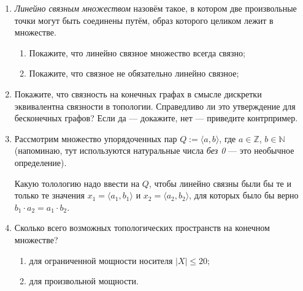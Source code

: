 \documentclass[10pt,a4paper,oneside]{article}
\begin{document}
\begin{enumerate}
\item \emph{Линейно связным множеством} назовём такое, в котором две произвольные точки могут быть соединены путём,
образ которого целиком лежит в множестве. 
\begin{enumerate}
\item Покажите, что линейно связное множество всегда связно;
\item Покажите, что связное не обязательно линейно связное;
\end{enumerate}

\item Покажите, что связность на конечных графах в смысле дискретки эквивалентна связности в топологии. 
Справедливо ли это утверждение для бесконечных графов? Если да --- докажите, нет --- приведите контрпример.

\item Рассмотрим множество упорядоченных пар $Q := \langle a,b \rangle$, где $a \in \mathbb{Z}$, $b \in \mathbb{N}$
(напоминаю, тут используются натуральные числа \emph{без 0} --- это необычное определение).

Какую толологию надо ввести на $Q$, чтобы линейно связны были бы те и только те значения $x_1 = \langle a_1, b_1 \rangle$
и $x_2 = \langle a_2, b_2 \rangle$, для которых было бы верно $b_1 \cdot a_2 = a_1 \cdot b_2$. 



\item Сколько всего возможных топологических пространств на конечном множестве?
\begin{enumerate}
\item для ограниченной мощности носителя $|X| \le 20$;
\item для произвольной мощности.
\end{enumerate}

\end{enumerate}
\end{document}
